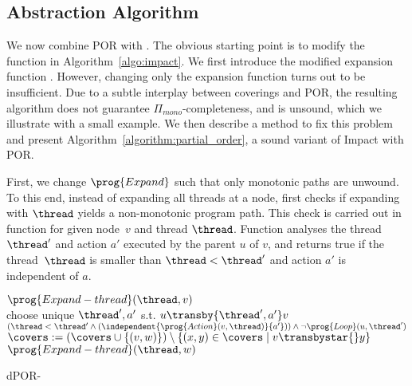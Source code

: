 \documentclass[conference]{IEEEtran}
\begin{document}
\subsection{Abstraction Algorithm}
\label{sec:abstr_alg}
%
We now combine POR with .
The obvious starting point is to modify
the  function in Algorithm~\ref{algo:impact}.
We first introduce the modified expansion function
\prog{\dporexpand}. However, changing only the expansion
function turns out to be insufficient.
Due to a subtle interplay between coverings and POR,
the resulting algorithm does not guarantee $\Pi_{mono}$-completeness,
and is unsound, which we illustrate with a small example.
We then describe a method to fix this problem
and present Algorithm~\ref{algorithm:partial_order},
a sound variant of Impact with POR.

First, we change $\prog{Expand}$ such that only
monotonic paths are unwound.
To this end, instead of expanding all threads at a node,
\prog{\dporexpand} first checks if expanding with $\thread$
yields a non-monotonic program path.
This check is carried out in function \prog{\dporskip}
for given node~$v$ and thread $\thread$.  
Function \prog{\dporskip} analyses
the thread~$\thread'$ and action $a'$ executed by the parent $u$ of $v$, and 
returns true if the thread~$\thread$ is smaller than $\thread<\thread'$ and action $a'$ is
independent of $a$.

\begin{algorithm}
\begin{algorithmic}[1]
\footnotesize
{}
          \State $\prog{Expand-thread}(\thread,v)$
    \EndFor
\EndProcedure 
\\
  \State choose unique $\thread', a'$ s.t. $u \smash{\transby{\thread', a'}} v$
  \State \Return $ \left (\thread < \smash \thread' \wedge \left ( \independent {\prog{Action}(v,\thread)}{a'} \right)\right) \wedge \neg 
  \smash{\prog{Loop}(u,\thread')}$
\EndProcedure  
\\
        		\State $\covers := (\covers \cup \{ (v,w) \}) \setminus \{(x,y)\in \covers \mid v \transbystar{} y \}$
              \State $\prog{Expand-thread}(\thread,w)$
            \EndFor
         \EndIf	
  \EndFor
\EndProcedure 
\end{algorithmic}
\caption{dPOR-\label{algorithm:partial_order}}
\end{algorithm}
\end{document}
